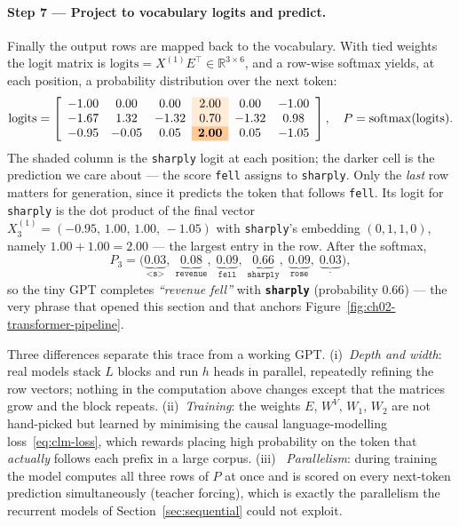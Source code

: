 \begin{deepdive}
\paragraph{Step 7 --- Project to vocabulary logits and predict.}
Finally the output rows are mapped back to the vocabulary.  With tied weights the
logit matrix is $\mathrm{logits} = X^{(1)} E^{\top} \in \mathbb{R}^{3 \times 6}$, and a
row-wise softmax yields, at each position, a probability distribution over the next
token:
\begin{equation*}
  \mathrm{logits} =
  \left[\begin{array}{ccc>{\columncolor{orange!16}}ccc}
    -1.00 & 0.00 & 0.00 & 2.00 & 0.00 & -1.00\\
    -1.67 & 1.32 & -1.32 & 0.70 & -1.32 & 0.98\\
    -0.95 & -0.05 & 0.05 & \cellcolor{orange!42}\mathbf{2.00} & 0.05 & -1.05
  \end{array}\right],
  \quad
  P = \mathrm{softmax}(\mathrm{logits}).
\end{equation*}
The shaded column is the \texttt{sharply} logit at each position; the darker cell is the
prediction we care about --- the score \texttt{fell} assigns to \texttt{sharply}.
Only the \emph{last} row matters for generation, since it predicts the token that
follows \texttt{fell}.  Its logit for \texttt{sharply} is the dot product of the final
vector $X^{(1)}_3 = (-0.95,\,1.00,\,1.00,\,-1.05)$ with \texttt{sharply}'s embedding
$(0,1,1,0)$, namely $1.00 + 1.00 = 2.00$ --- the largest entry in the row.  After the
softmax,
\begin{equation*}
  P_3 =
  \bigl(\underbrace{0.03}_{\texttt{<s>}},\;
        \underbrace{0.08}_{\texttt{revenue}},\;
        \underbrace{0.09}_{\texttt{fell}},\;
        \underbrace{\mathbf{0.66}}_{\texttt{sharply}},\;
        \underbrace{0.09}_{\texttt{rose}},\;
        \underbrace{0.03}_{\texttt{.}}\bigr),
\end{equation*}
so the tiny GPT completes \textit{``revenue fell''} with \textbf{\texttt{sharply}}
(probability $0.66$) --- the very phrase that opened this section and that anchors
Figure~\ref{fig:ch02-transformer-pipeline}.

\begin{remark}
\label{rem:tinygpt-scale}
Three differences separate this trace from a working GPT.  (i)~\emph{Depth and
width}: real models stack $L$ blocks and run $h$ heads in parallel, repeatedly
refining the row vectors; nothing in the computation above changes except that the
matrices grow and the block repeats.  (ii)~\emph{Training}: the weights $E$, $W^V$,
$W_1$, $W_2$ are not hand-picked but learned by minimising the causal
language-modelling loss~\eqref{eq:clm-loss}, which rewards placing high probability on
the token that \emph{actually} follows each prefix in a large corpus.  (iii)~\emph{
Parallelism}: during training the model computes all three rows of $P$ at once and is
scored on every next-token prediction simultaneously (teacher forcing), which is
exactly the parallelism the recurrent models of Section~\ref{sec:sequential} could not
exploit.
\end{remark}
\endgroup


\end{deepdive}
